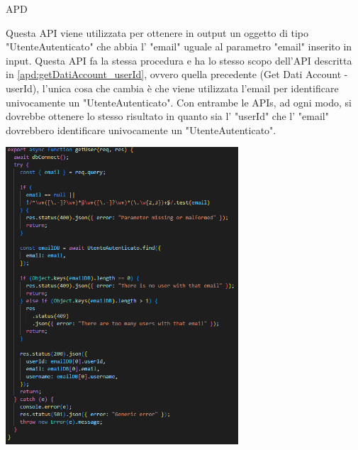 \begin{listaPersonale} {APD}
\begin{listaPersonale2}[APD]{}
\begin{center}
                \end{center}
                \newpage
                Questa API viene utilizzata per ottenere in output un oggetto di tipo "UtenteAutenticato" che abbia l' "email" uguale al parametro "email" inserito in input. Questa API fa la stessa procedura e ha lo stesso scopo dell'API descritta in \ref{apd:getDatiAccount_userId}, ovvero quella precedente (Get Dati Account - userId), l'unica cosa che cambia è che viene utilizzata l'email per identificare univocamente un "UtenteAutenticato". Con entrambe le APIs, ad ogni modo, si dovrebbe ottenere lo stesso risultato in quanto sia l' "userId" che l' "email" dovrebbero identificare univocamente un "UtenteAutenticato".
                \begin{center}
                    \includegraphics[width=0.65\textwidth, height=0.55\textheight]{img/png/APIs/getUser_email.png}
                \end{center}
                \newpage
    \end{listaPersonale2}
\end{listaPersonale}